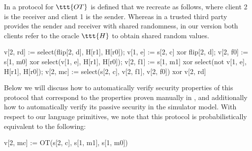 \begin{example}
  \label{example-OT}
  In \cite{barthe2019probabilistic} a protocol for $\ttt{OT}$ is defined that we recreate as
  follows, where client 2 is the receiver and client 1 is the sender. Whereas
  in \cite{barthe2019probabilistic} a trusted third party provides the sender and receiver with
  shared randomness, in our version both clients refer to the oracle $\ttt{H}$
  to obtain shared random values. 
\begin{verbatimtab}
  v[2, rd] := select(flip[2, d], H[r1], H[r0]);
  v[1, e] := s[2, c] xor flip[2, d];
  v[2, f0] := s[1, m0] xor select(v[1, e], H[r1], H[r0]);
  v[2, f1] := s[1, m1] xor select(not v[1, e], H[r1], H[r0]);
  v[2, mc] := select(s[2, c], v[2, f1], v[2, f0]) xor v[2, rd]
\end{verbatimtab}
Below we will discuss how to automatically verify security properties
of this protocol that correspond to the properties proven manually in
\cite{barthe2019probabilistic}, and additionally how to automatically verify its passive
security in the simulator model. With respect to our language primitives,
we note that this protocol is probabilistically equivalent to the
following:
\begin{verbatimtab}  
  v[2, mc] := OT(s[2, c], s[1, m1], s[1, m0])
\end{verbatimtab}
\end{example}

